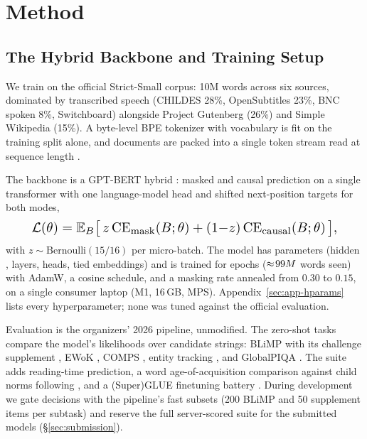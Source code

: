 \section{Method}
\label{sec:method-top}

\subsection{The Hybrid Backbone and Training Setup}
\label{sec:setup}
We train on the official Strict-Small corpus: 10M words across six sources,
dominated by transcribed speech (CHILDES 28\%, OpenSubtitles 23\%, BNC
spoken 8\%, Switchboard) alongside Project Gutenberg (26\%) and Simple
Wikipedia (15\%). A byte-level BPE tokenizer with vocabulary \rVocab{} is
fit on the training split alone, and documents are packed into a single
token stream read at sequence length \rSeq{}.

The backbone is a GPT-BERT hybrid \citep{charpentier2024gptbert}: masked
and causal prediction on a single transformer with one language-model head
and shifted next-position targets for both modes,
\begin{equation}
\label{eq:hybrid}
\resizebox{0.89\columnwidth}{!}{$
\mathcal{L}(\theta) = \mathbb{E}_{B}\big[\, z\,\mathrm{CE}_{\text{mask}}(B;\theta) + (1{-}z)\,\mathrm{CE}_{\text{causal}}(B;\theta)\,\big],
$}
\end{equation}
with $z\sim\mathrm{Bernoulli}(15/16)$ per micro-batch. The model has
\rParams{} parameters (hidden \rHidden, \rLayers{} layers, \rHeads{} heads,
tied embeddings) and is trained for \rEpochs{} epochs
($\approx\!99M$ words seen) with AdamW, a cosine schedule, and a
masking rate annealed from $0.30$ to $0.15$, on a single consumer laptop
(M1, 16\,GB, MPS). Appendix~\ref{sec:app-hparams} lists every
hyperparameter; none was tuned against the official evaluation.

Evaluation is the organizers' 2026 pipeline, unmodified. The zero-shot
tasks compare the model's likelihoods over candidate strings: BLiMP
\citep{warstadt2020blimp} with its challenge supplement
\citep{warstadt2023findings}, EWoK \citep{ivanova2024ewok}, COMPS
\citep{misra2023comps}, entity tracking \citep{kim2023entity}, and
GlobalPIQA \citep{chang2025globalpiqa}. The suite adds reading-time
prediction, a word age-of-acquisition comparison against child norms
following \citet{chang2022word}, and a (Super)GLUE finetuning battery
\citep{wang2018glue,wang2019superglue}. During development we gate
decisions with the pipeline's fast subsets (200 BLiMP and 50 supplement
items per subtask) and reserve the full server-scored suite for the
submitted models (\S\ref{sec:submission}).

